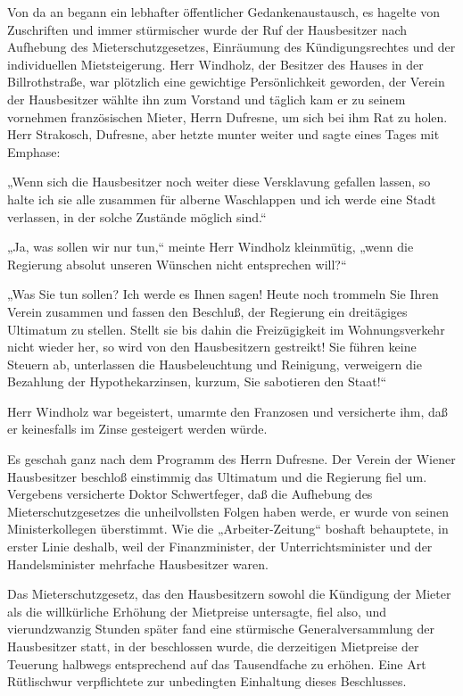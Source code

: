 Von da an begann ein lebhafter öffentlicher Gedankenaustausch, es
hagelte von Zuschriften und immer stürmischer wurde der Ruf der
Hausbesitzer nach Aufhebung des Mieterschutzgesetzes, Einräumung
des Kündigungsrechtes und der individuellen Mietsteigerung. Herr
Windholz, der Besitzer des Hauses in der Billrothstraße, war
plötzlich eine gewichtige Persönlichkeit geworden, der Verein der
Hausbesitzer wählte ihn zum Vorstand und täglich kam er zu seinem
vornehmen französischen Mieter, Herrn Dufresne, um sich bei ihm Rat
zu holen. Herr Strakosch,  Dufresne, aber hetzte
munter weiter und sagte eines Tages mit Emphase:

„Wenn sich die Hausbesitzer noch weiter diese Versklavung gefallen
lassen, so halte ich sie alle zusammen für alberne Waschlappen und
ich werde eine Stadt verlassen, in der solche Zustände möglich
sind.“

„Ja, was sollen wir nur tun,“ meinte Herr Windholz kleinmütig,
„wenn die Regierung absolut unseren Wünschen nicht entsprechen
will?“

„Was Sie tun sollen? Ich werde es Ihnen sagen! Heute noch trommeln
Sie Ihren Verein zusammen und  fassen den Beschluß,
der Regierung ein dreitägiges Ultimatum zu stellen. Stellt sie bis
dahin die Freizügigkeit im Wohnungsverkehr nicht wieder her, so
wird von den Hausbesitzern gestreikt! Sie führen keine Steuern ab,
unterlassen die Hausbeleuchtung und Reinigung, verweigern die
Bezahlung der Hypothekarzinsen, kurzum, Sie sabotieren den Staat!“

Herr Windholz war begeistert, umarmte den Franzosen und versicherte
ihm, daß er keinesfalls im Zinse gesteigert werden würde.

Es geschah ganz nach dem Programm des Herrn Dufresne. Der Verein
der Wiener Hausbesitzer beschloß einstimmig das Ultimatum und die
Regierung fiel um. Vergebens versicherte Doktor Schwertfeger, daß
die Aufhebung des Mieterschutzgesetzes die unheilvollsten Folgen
haben werde, er wurde von seinen Ministerkollegen überstimmt. Wie
die „Arbeiter-Zeitung“ boshaft behauptete, in erster Linie deshalb,
weil der Finanzminister, der Unterrichtsminister und der
Handelsminister mehrfache Hausbesitzer waren.

Das Mieterschutzgesetz, das den Hausbesitzern sowohl die Kündigung
der Mieter als die willkürliche Erhöhung der Mietpreise untersagte,
fiel also, und vierundzwanzig Stunden später fand eine stürmische
Generalversammlung der Hausbesitzer statt, in der beschlossen
wurde, die derzeitigen Mietpreise der Teuerung halbwegs
entsprechend auf das Tausendfache zu erhöhen. Eine Art Rütlischwur
verpflichtete zur unbedingten Einhaltung dieses Beschlusses.

